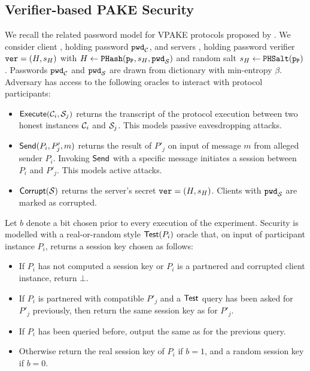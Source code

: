 \subsection{Verifier-based PAKE Security}

We recall the related password model for \ac{VPAKE} protocols proposed by \citet{BenhamoudaP13}.
We consider client \Client, holding password $\mathtt{pwd}_\mathcal{C}$, and servers \Server, holding password verifier $\mathtt{ver}=(H,s_H)$ with $H\gets\mathtt{PHash}(\mathtt{p_P}, s_H, \mathtt{pwd}_\mathcal{S})$ and random salt $s_H\gets\mathtt{PHSalt}(\mathtt{p_P})$.
Passwords $\mathtt{pwd}_\mathcal{C}$ and $\mathtt{pwd}_\mathcal{S}$ are drawn from dictionary \cD with min-entropy $\beta$.
Adversary \cA has access to the following oracles to interact with protocol participants:

\begin{itemize}
	\item $\mathsf{Execute}(\mathcal{C}_i,\mathcal{S}_j)$ returns the transcript of the protocol execution between two honest instances $\mathcal{C}_i$ and $\mathcal{S}_j$.
		This models passive eavesdropping attacks.
	
	\item $\mathsf{Send}(P_i, P'_j, m)$ returns the result of $P'_j$ on input of message $m$ from alleged sender $P_i$.
		Invoking $\mathsf{Send}$ with a specific message initiates a session between $P_i$ and $P'_j$.
		This models active attacks.
		
	\item $\mathsf{Corrupt}(\mathcal{S})$ returns the server's secret $\mathtt{ver}=(H,s_H)$.
		Clients with $\mathtt{pwd}_\mathcal{S}$ are marked as corrupted.
\end{itemize}

\noindent
Let $b$ denote a bit chosen prior to every execution of the experiment.
Security is modelled with a real-or-random style $\mathsf{Test}(P_i)$ oracle that, on input of participant instance $P_i$, returns a session key \key chosen as follows:
\begin{itemize}
	\item If $P_i$ has not computed a session key or $P_i$ is a partnered and corrupted client instance, return $\bot$.
	
	\item If $P_i$ is partnered with compatible $P'_j$ and a $\mathsf{Test}$ query has been asked for $P'_j$ previously, then return the same session key as for $P'_j$.
	
	\item If $P_i$ has been queried before, output the same as for the previous query.
	
	\item Otherwise return the real session key of $P_i$ if $b=1$, and a random session key if $b=0$.
\end{itemize}


